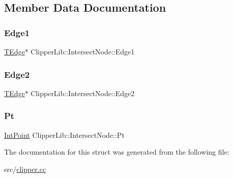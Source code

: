 \subsection{Member Data Documentation}
\mbox{\label{struct_clipper_lib_1_1_intersect_node_a43fd790cc38441edb594841d79b25f13}} 
\subsubsection{\texorpdfstring{Edge1}{Edge1}}
{\footnotesize\ttfamily \mbox{\hyperlink{struct_clipper_lib_1_1_t_edge}{T\+Edge}}$\ast$ Clipper\+Lib\+::\+Intersect\+Node\+::\+Edge1}

\mbox{\label{struct_clipper_lib_1_1_intersect_node_afcb56e7564fedf1c90962a9f75454539}} 
\subsubsection{\texorpdfstring{Edge2}{Edge2}}
{\footnotesize\ttfamily \mbox{\hyperlink{struct_clipper_lib_1_1_t_edge}{T\+Edge}}$\ast$ Clipper\+Lib\+::\+Intersect\+Node\+::\+Edge2}

\mbox{\label{struct_clipper_lib_1_1_intersect_node_a91fc92370fb47797dae0602443e6475e}} 
\subsubsection{\texorpdfstring{Pt}{Pt}}
{\footnotesize\ttfamily \mbox{\hyperlink{struct_clipper_lib_1_1_int_point}{Int\+Point}} Clipper\+Lib\+::\+Intersect\+Node\+::\+Pt}



The documentation for this struct was generated from the following file\+:\begin{DoxyCompactItemize}
\item 
src/\mbox{\hyperlink{clipper_8cc}{clipper.\+cc}}\end{DoxyCompactItemize}
